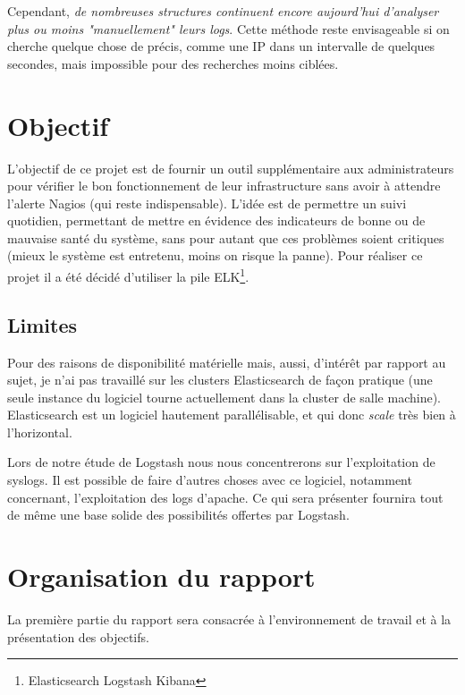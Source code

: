 \documentclass[a4paper,12pt,one side,titlepage]{report}
\begin{document}
Cependant, \emph{de nombreuses structures continuent encore aujourd'hui d'analyser 
plus ou moins "manuellement" leurs \emph{\gls{logs}}}. Cette méthode reste envisageable 
si on cherche quelque chose de précis, comme une IP dans un intervalle de quelques 
secondes, mais impossible pour des recherches moins ciblées.


\section{Objectif}
L'objectif de ce projet est de fournir un outil supplémentaire aux administrateurs
pour vérifier le bon fonctionnement de leur infrastructure sans avoir à attendre l'alerte
Nagios (qui reste indispensable). L'idée est de permettre un suivi quotidien, permettant
de mettre en évidence des indicateurs de bonne ou de mauvaise santé du système, sans 
pour autant que ces problèmes soient critiques (mieux le système est entretenu, moins
on risque la panne).
Pour réaliser ce projet il a été décidé d'utiliser la pile ELK\footnote{Elasticsearch Logstash Kibana}.



\subsection{Limites}
Pour des raisons de disponibilité matérielle mais, aussi, d'intérêt par rapport au sujet,
je n'ai pas travaillé sur les clusters Elasticsearch de façon pratique (une seule 
instance du logiciel tourne actuellement dans la cluster de salle machine). Elasticsearch
est un logiciel hautement parallélisable, et qui donc \textit{scale} très bien à 
l'horizontal. 


Lors de notre étude de Logstash nous nous concentrerons sur l'exploitation de syslogs. 
Il est possible de faire d'autres choses avec ce logiciel, notamment concernant, 
l'exploitation des logs d'apache. 
Ce qui sera présenter fournira tout de même une base solide des possibilités offertes
par Logstash.


\section{Organisation du rapport}
La première partie du rapport sera consacrée à l'environnement de travail et à la 
présentation des objectifs. 
\end{document}
